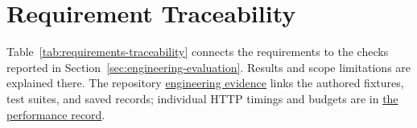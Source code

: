 \clearpage
\section{Requirement Traceability}
\label{sec:requirement-traceability}

Table~\ref{tab:requirements-traceability} connects the requirements to the checks reported in Section~\ref{sec:engineering-evaluation}. Results and scope limitations are explained there. The repository \href{https://github.com/ralucabiras/emotion-aware-role-play-model/blob/main/docs/evidence-package/engineering-demonstration.md}{engineering evidence} links the authored fixtures, test suites, and saved records; individual HTTP timings and budgets are in \href{https://github.com/ralucabiras/emotion-aware-role-play-model/blob/main/docs/evidence-package/generated/performance-v1.json}{the performance record}.


